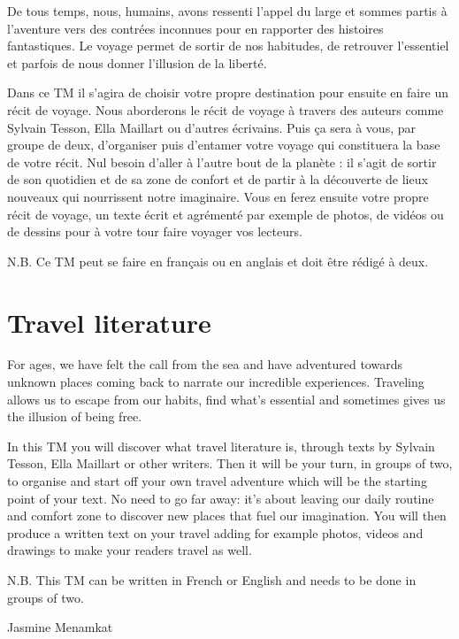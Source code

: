\documentclass[
  10pt,
  french,
  a5paper,
  openany]{book}
\newenvironment{signature}{\begin{flushright}}{\end{flushright}}
\begin{document}
De tous temps, nous, humains, avons ressenti l'appel du large et sommes partis à l'aventure vers des contrées inconnues pour en rapporter des histoires fantastiques. Le voyage permet de sortir de nos habitudes, de retrouver l'essentiel et parfois de nous donner l'illusion de la liberté.

Dans ce TM il s'agira de choisir votre propre destination pour ensuite en faire un récit de voyage. Nous aborderons le récit de voyage à travers des auteurs comme Sylvain Tesson, Ella Maillart ou d'autres écrivains. Puis ça sera à vous, par groupe de deux, d'organiser puis d'entamer votre voyage qui constituera la base de votre récit. Nul besoin d'aller à l'autre bout de la planète : il s'agit de sortir de son quotidien et de sa zone de confort et de partir à la découverte de lieux nouveaux qui nourrissent notre imaginaire. Vous en ferez ensuite votre propre récit de voyage, un texte écrit et agrémenté par exemple de photos, de vidéos ou de dessins pour à votre tour faire voyager vos lecteurs.

N.B. Ce TM peut se faire en français ou en anglais et doit être rédigé à deux.

\hypertarget{travel-literature}{%
\section*{Travel literature}\label{travel-literature}}

For ages, we have felt the call from the sea and have adventured towards unknown places coming back to narrate our incredible experiences. Traveling allows us to escape from our habits, find what's essential and sometimes gives us the illusion of being free.

In this TM you will discover what travel literature is, through texts by Sylvain Tesson, Ella Maillart or other writers. Then it will be your turn, in groups of two, to organise and start off your own travel adventure which will be the starting point of your text. No need to go far away: it's about leaving our daily routine and comfort zone to discover new places that fuel our imagination. You will then produce a written text on your travel adding for example photos, videos and drawings to make your readers travel as well.

N.B. This TM can be written in French or English and needs to be done in groups of two.

\begin{signature}
Jasmine Menamkat

\end{signature}
\end{document}

